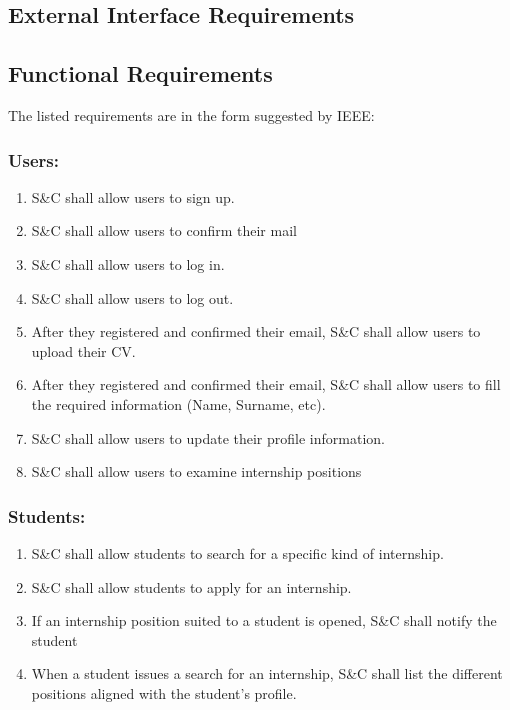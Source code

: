 

\subsection{External Interface Requirements}

\subsection{Functional Requirements}
    The listed requirements are in the form suggested by IEEE: 
    \newline
    \subsubsection*{Users:}
        \begin{enumerate}[label=\textbf{R\arabic*}]
            \item S\&C shall allow users to sign up.
            \item S\&C shall allow users to confirm their mail
            \item S\&C shall allow users to log in.
            \item S\&C shall allow users to log out.
            \item After they registered and confirmed their email, S\&C shall allow users to upload their CV.
            \item After they registered and confirmed their email, S\&C shall allow users to fill the required information (Name, Surname, etc).
            \item S\&C shall allow users to update their profile information.
            \item S\&C shall allow users to examine internship positions
        \end{enumerate}
        
    \subsubsection*{Students:}
        \begin{enumerate}[label=\textbf{R\arabic*},resume]
            \item S\&C shall allow students to search for a specific kind of internship.    
            \item S\&C shall allow students to apply for an internship.     %
            \item If an internship position suited to a student is opened, S\&C shall notify the student
            \item When a student issues a search for an internship, S\&C shall list the different positions aligned with the student's profile.         %
    
            
        \end{enumerate}
    
